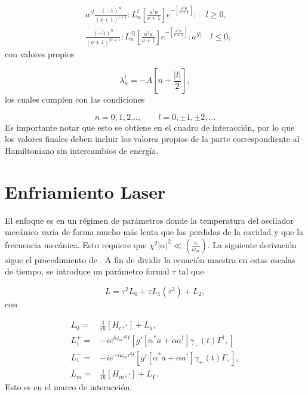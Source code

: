 \documentclass[10pt,a4paper]{report}
\begin{document}
\begin{align}\label{DefDB}
&a^{\dagger l}\frac{(-1)^n}{(\nu+1)^{l+1}}:L_n^l[\frac{a^\dagger a}{\nu+1}]e^{-[\frac{a^\dagger a}{\nu+1}]}:\quad l \geq 0, \\
&\frac{(-1)^n}{(\nu+1)^{|l|+1}}:L_n^{|l|}[\frac{a^\dagger a}{\nu+1}]e^{-[\frac{a^\dagger a}{\nu+1}]}:a^{|l|}\quad l \leq 0,
\end{align} con valores propios

\begin{equation}
\lambda_n^l = -A[n + \frac{|l|}{2}],
\end{equation} los cuales cumplen con las condiciones

\begin{equation}
n=0,1,2...,\qquad l = 0,\pm 1, \pm 2,... 
\end{equation}Es importante notar que esto se obtiene en el cuadro de interacción, por lo que los valores finales deben incluir los valores propios de la parte correspondiente al Hamiltoniano sin intercambios de energía. 
 

\section{Enfriamiento Laser}\label{LasCool}

El enfoque es en un régimen de parámetros donde la temperatura del oscilador mecánico varía de forma mucho más lenta que las perdidas de la cavidad y que la frecuencia mecánica. Esto requiere que $\chi^2 |\alpha|^2 \ll (\frac{\kappa}{\omega_m})$. La siguiente derivación sigue el procedimiento de  \cite{LCNooshi}. A fin de dividir la ecuación maestra en estas escalas de tiempo, se introduce un parámetro formal $\tau$ tal que

 
\begin{equation}
L = \tau^2 L_0 + \tau L_1(\tau^2) + L_2,
\end{equation} con

\begin{align*}
L_0 =& \frac{1}{i\hbar}[H_c,\cdot] + L_a,\\
L_1^+ =& -ie^{i\omega_m \tau^2 t}[g'[\alpha^* a + \alpha a^\dagger]\gamma_-(t)\Gamma^\dagger,]\\
L_1^- =&-ie^{-i\omega_m \tau^2 t}[g'[\alpha^* a + \alpha a^\dagger]\gamma_+(t)\Gamma,],\\
L_m =& \frac{1}{i\hbar}[H_m,\cdot] + L_\Gamma.
\end{align*}Esto es en el marco de interacción.
\end{document}

